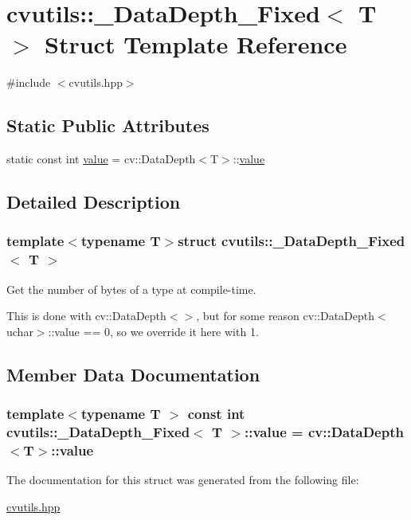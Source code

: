 \hypertarget{structcvutils_1_1___data_depth___fixed}{\section{cvutils\-:\-:\-\_\-\-Data\-Depth\-\_\-\-Fixed$<$ T $>$ Struct Template Reference}
\label{structcvutils_1_1___data_depth___fixed}
}


{\ttfamily \#include $<$cvutils.\-hpp$>$}

\subsection*{Static Public Attributes}
\begin{DoxyCompactItemize}
\item 
static const int \hyperlink{structcvutils_1_1___data_depth___fixed_abecf0b84192c9548f8ace31b11c64618}{value} = cv\-::\-Data\-Depth$<$T$>$\-::\hyperlink{structcvutils_1_1___data_depth___fixed_abecf0b84192c9548f8ace31b11c64618}{value}
\end{DoxyCompactItemize}


\subsection{Detailed Description}
\subsubsection*{template$<$typename T$>$struct cvutils\-::\-\_\-\-Data\-Depth\-\_\-\-Fixed$<$ T $>$}

Get the number of bytes of a type at compile-\/time.

This is done with {\ttfamily cv\-::\-Data\-Depth$<$$>$}, but for some reason {\ttfamily cv\-::\-Data\-Depth$<$uchar$>$\-::value} == 0, so we override it here with 1. 

\subsection{Member Data Documentation}
\hypertarget{structcvutils_1_1___data_depth___fixed_abecf0b84192c9548f8ace31b11c64618}{
\subsubsection[{value}]{\setlength{\rightskip}{0pt plus 5cm}template$<$typename T $>$ const int {\bf cvutils\-::\-\_\-\-Data\-Depth\-\_\-\-Fixed}$<$ T $>$\-::{\bf value} = cv\-::\-Data\-Depth$<$T$>$\-::{\bf value}}}\label{structcvutils_1_1___data_depth___fixed_abecf0b84192c9548f8ace31b11c64618}


The documentation for this struct was generated from the following file\-:\begin{DoxyCompactItemize}
\item 
\hyperlink{cvutils_8hpp}{cvutils.\-hpp}\end{DoxyCompactItemize}

